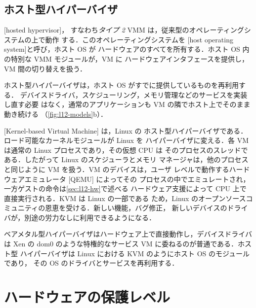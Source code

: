\documentclass[../main.tex]{subfiles}
\begin{document}
\subsection{ホスト型ハイパーバイザ}

\begin{definition}[ホスト型ハイパーバイザ]
  [hosted hypervisor]，
  すなわち\emph{タイプ 2} VMM は，従来型のオペレーティングシステムの上で動作
  する．このオペレーティングシステムを
  [host operating system]と呼び，ホスト OS が
  ハードウェアのすべてを所有する．ホスト OS 内の特別な VMM モジュールが，VM に
  ハードウェアインタフェースを提供し，VM 間の切り替えを扱う．
\end{definition}

ホスト型ハイパーバイザは，ホスト OS がすでに提供しているものを再利用する．
デバイスドライバ，スケジューリング，メモリ管理などのサービスを実装し直す必要
はなく，通常のアプリケーションも VM の隣でホスト上でそのまま動き続ける
（\cref{fig:l12-models}b）．

[Kernel-based Virtual Machine]%
 \cite{kivity2007} は，Linux の
ホスト型ハイパーバイザである．ロード可能なカーネルモジュールが Linux を
ハイパーバイザに変える．各 VM は通常の Linux プロセスであり，その仮想 CPU は
そのプロセスのスレッドである．したがって Linux のスケジューラとメモリ
マネージャは，他のプロセスと同じように VM を扱う．VM のデバイスは，ユーザ
レベルで動作するハードウェアエミュレータ [QEMU] によってその
プロセスの中でエミュレートされ，一方ゲストの命令は\cref{sec:l12-hw}で述べる
ハードウェア支援によって CPU 上で直接実行される．KVM は Linux の一部である
ため，Linux のオープンソースコミュニティの恩恵を受ける．新しい機能，バグ修正，
新しいデバイスのドライバが，別途の労力なしに利用できるようになる．

\begin{keypoint}
  ベアメタル型ハイパーバイザはハードウェア上で直接動作し，デバイスドライバは
  Xen の dom0 のような特権的なサービス VM に委ねるのが普通である．ホスト型
  ハイパーバイザは Linux における KVM のようにホスト OS のモジュールであり，
  その OS のドライバとサービスを再利用する．
\end{keypoint}

\section{ハードウェアの保護レベル}
\label{sec:l12-rings}
\end{document}
